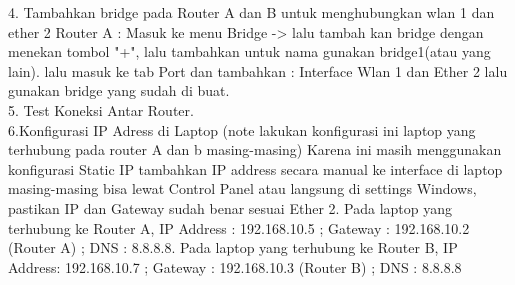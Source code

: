 4. Tambahkan bridge pada Router A dan B untuk menghubungkan wlan 1 dan ether 2 Router A : Masuk ke menu Bridge -> lalu tambah kan bridge dengan menekan tombol "+", lalu tambahkan untuk nama gunakan bridge1(atau yang lain). lalu masuk ke tab Port dan tambahkan : Interface Wlan 1 dan Ether 2 lalu gunakan bridge yang sudah di buat. \\ 
5. Test Koneksi Antar Router. \\
6.Konfigurasi IP Adress di Laptop (note lakukan konfigurasi ini laptop yang terhubung pada router A dan b masing-masing) Karena ini masih menggunakan konfigurasi Static IP tambahkan IP address secara manual ke interface di laptop masing-masing bisa lewat Control Panel atau langsung di settings Windows, pastikan IP dan Gateway sudah benar sesuai Ether 2. Pada laptop yang terhubung ke Router A, IP Address : 192.168.10.5 ; Gateway : 192.168.10.2 (Router A) ; DNS : 8.8.8.8. Pada laptop yang terhubung ke Router B, IP Address: 192.168.10.7 ; Gateway : 192.168.10.3 (Router B) ; DNS : 8.8.8.8
